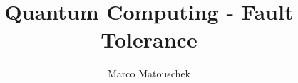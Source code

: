 \documentclass[en]{protocol}
\title{Quantum Computing - Fault Tolerance}
\author{Marco Matouschek}
\begin{document}
\newpage
\begin{abstract}\end{abstract} 	%
\end{document}
